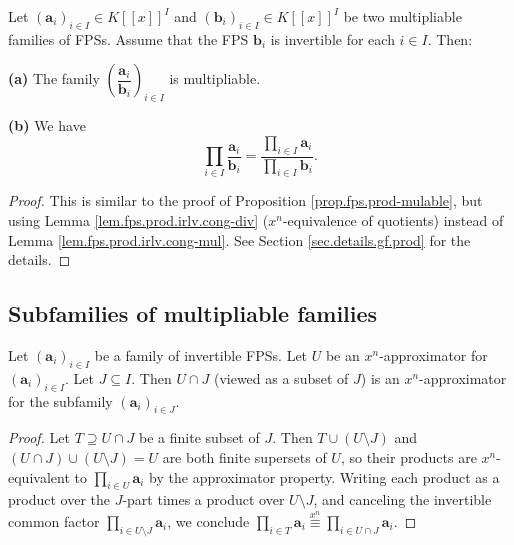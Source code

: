 \begin{proposition}
\label{prop.fps.div-mulable}
\leantarget
\leanok
Let $\left(\mathbf{a}_{i}\right)_{i\in I}\in K\left[\left[x\right]\right]^{I}$
and $\left(\mathbf{b}_{i}\right)_{i\in I}\in K\left[\left[x\right]\right]^{I}$
be two multipliable families of FPSs. Assume that the FPS $\mathbf{b}_{i}$ is
invertible for each $i\in I$. Then:

\textbf{(a)} The family $\left(\dfrac{\mathbf{a}_{i}}{\mathbf{b}_{i}}\right)_{i\in I}$
is multipliable.

\textbf{(b)} We have
\[
\prod_{i\in I}\dfrac{\mathbf{a}_{i}}{\mathbf{b}_{i}}
=\dfrac{\prod_{i\in I}\mathbf{a}_{i}}{\prod_{i\in I}\mathbf{b}_{i}}.
\]
\end{proposition}

\begin{proof}
This is similar to the proof of Proposition \ref{prop.fps.prod-mulable}, but
using Lemma \ref{lem.fps.prod.irlv.cong-div} ($x^n$-equivalence of quotients)
instead of Lemma \ref{lem.fps.prod.irlv.cong-mul}. See Section
\ref{sec.details.gf.prod} for the details.
\end{proof}

\subsection{Subfamilies of multipliable families}

\begin{lemma}
\label{lem.fps.prods-mulable-subfams-appr}
\leanhelper
\leanok
Let $\left(\mathbf{a}_{i}\right)_{i\in I}$ be a family of invertible FPSs.
Let $U$ be an $x^n$-approximator for $\left(\mathbf{a}_{i}\right)_{i\in I}$.
Let $J\subseteq I$. Then $U\cap J$ (viewed as a subset of $J$) is an
$x^n$-approximator for the subfamily $\left(\mathbf{a}_{i}\right)_{i\in J}$.
\end{lemma}

\begin{proof}
\leanok
Let $T\supseteq U\cap J$ be a finite subset of $J$. Then
$T\cup (U\setminus J)$ and $(U\cap J)\cup (U\setminus J) = U$ are both
finite supersets of $U$, so their products are $x^n$-equivalent
to $\prod_{i\in U}\mathbf{a}_i$ by the approximator property.
Writing each product as a product over the $J$-part times a product over
$U\setminus J$, and canceling the invertible common factor
$\prod_{i\in U\setminus J}\mathbf{a}_i$, we conclude
$\prod_{i\in T}\mathbf{a}_i \overset{x^n}{\equiv} \prod_{i\in U\cap J}\mathbf{a}_i$.
\end{proof}

